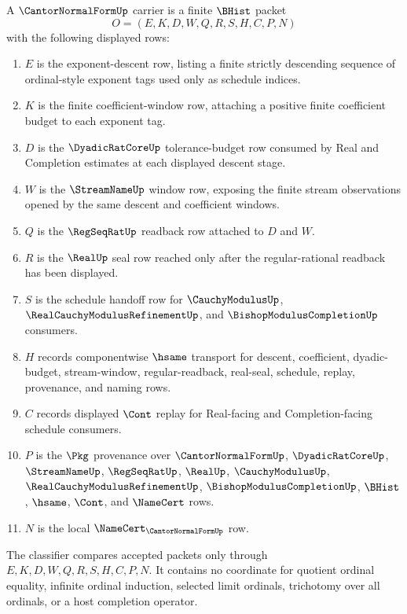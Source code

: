 \begin{definition}
\label{def:cantor-normal-form-carrier}
A $\CantorNormalFormUp$ carrier is a finite $\BHist$ packet
$$
O=(E,K,D,W,Q,R,S,H,C,P,N)
$$
with the following displayed rows:
\begin{enumerate}
\item $E$ is the exponent-descent row, listing a finite strictly descending sequence of ordinal-style exponent tags used only as schedule indices.
\item $K$ is the finite coefficient-window row, attaching a positive finite coefficient budget to each exponent tag.
\item $D$ is the $\DyadicRatCoreUp$ tolerance-budget row consumed by Real and Completion estimates at each displayed descent stage.
\item $W$ is the $\StreamNameUp$ window row, exposing the finite stream observations opened by the same descent and coefficient windows.
\item $Q$ is the $\RegSeqRatUp$ readback row attached to $D$ and $W$.
\item $R$ is the $\RealUp$ seal row reached only after the regular-rational readback has been displayed.
\item $S$ is the schedule handoff row for $\CauchyModulusUp$, $\RealCauchyModulusRefinementUp$, and $\BishopModulusCompletionUp$ consumers.
\item $H$ records componentwise $\hsame$ transport for descent, coefficient, dyadic-budget, stream-window, regular-readback, real-seal, schedule, replay, provenance, and naming rows.
\item $C$ records displayed $\Cont$ replay for Real-facing and Completion-facing schedule consumers.
\item $P$ is the $\Pkg$ provenance over $\CantorNormalFormUp$, $\DyadicRatCoreUp$, $\StreamNameUp$, $\RegSeqRatUp$, $\RealUp$, $\CauchyModulusUp$, $\RealCauchyModulusRefinementUp$, $\BishopModulusCompletionUp$, $\BHist$, $\hsame$, $\Cont$, and $\NameCert$ rows.
\item $N$ is the local $\NameCert_{\CantorNormalFormUp}$ row.
\end{enumerate}
The classifier compares accepted packets only through $E,K,D,W,Q,R,S,H,C,P,N$. It contains no coordinate for quotient ordinal equality, infinite ordinal induction, selected limit ordinals, trichotomy over all ordinals, or a host completion operator.
\end{definition}

